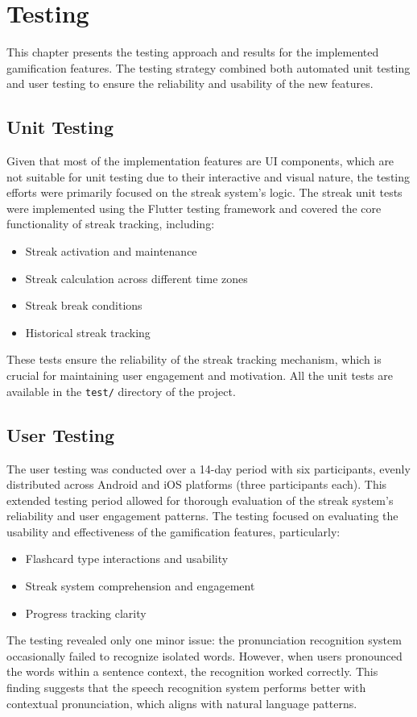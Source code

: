 \chapter{Testing}
\label{chap:testing}

This chapter presents the testing approach and results for the implemented gamification features. The testing strategy combined both automated unit testing and user testing to ensure the reliability and usability of the new features.

\section{Unit Testing}

Given that most of the implementation features are UI components, which are not suitable for unit testing due to their interactive and visual nature, the testing efforts were primarily focused on the streak system's logic. The streak unit tests were implemented using the Flutter testing framework and covered the core functionality of streak tracking, including:

\begin{itemize}
    \item Streak activation and maintenance
    \item Streak calculation across different time zones
    \item Streak break conditions
    \item Historical streak tracking
\end{itemize}

These tests ensure the reliability of the streak tracking mechanism, which is crucial for maintaining user engagement and motivation. All the unit tests are available in the \texttt{test/} directory of the project.

\newpage
\section{User Testing}
The user testing was conducted over a 14-day period with six participants, evenly distributed across Android and iOS platforms (three participants each). This extended testing period allowed for thorough evaluation of the streak system's reliability and user engagement patterns. The testing focused on evaluating the usability and effectiveness of the gamification features, particularly:
\begin{itemize}
    \item Flashcard type interactions and usability
    \item Streak system comprehension and engagement
    \item Progress tracking clarity
\end{itemize}
The testing revealed only one minor issue: the pronunciation recognition system occasionally failed to recognize isolated words. However, when users pronounced the words within a sentence context, the recognition worked correctly. This finding suggests that the speech recognition system performs better with contextual pronunciation, which aligns with natural language patterns.


